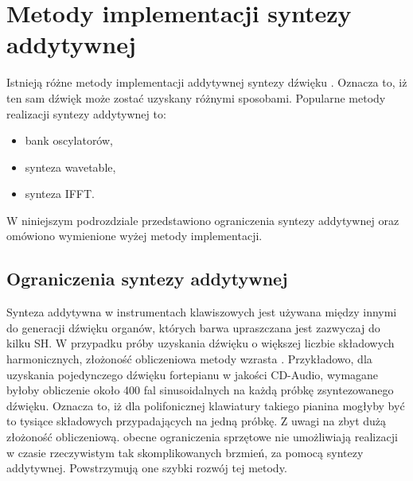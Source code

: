 \section{Metody implementacji syntezy addytywnej}
Istnieją różne metody implementacji addytywnej syntezy dźwięku \cite{add_imp_meth}. Oznacza to, iż ten sam dźwięk może zostać uzyskany różnymi sposobami. Popularne metody realizacji syntezy addytywnej to:
\begin{itemize}
	\item bank oscylatorów,
	\item synteza wavetable,
	\item synteza IFFT.
\end{itemize}
W niniejszym podrozdziale przedstawiono ograniczenia syntezy addytywnej oraz omówiono wymienione wyżej metody implementacji.

\subsection{Ograniczenia syntezy addytywnej} \label{addit_ograniczenia}
Synteza addytywna w instrumentach klawiszowych jest używana między innymi do generacji dźwięku organów, których barwa upraszczana jest zazwyczaj do kilku SH. W przypadku próby uzyskania dźwięku o większej liczbie składowych harmonicznych, złożoność obliczeniowa metody wzrasta \cite{add_ograniczenia}.
Przykładowo, dla uzyskania pojedynczego dźwięku fortepianu w jakości CD-Audio,
wymagane byłoby obliczenie około 400 fal sinusoidalnych na każdą próbkę zsyntezowanego dźwięku. Oznacza to, iż dla polifonicznej klawiatury takiego pianina mogłyby być to tysiące składowych przypadających na jedną próbkę. Z uwagi na zbyt dużą złożoność obliczeniową. obecne ograniczenia sprzętowe nie umożliwiają realizacji w czasie rzeczywistym tak skomplikowanych brzmień, za pomocą syntezy addytywnej. Powstrzymują one szybki rozwój tej metody.

